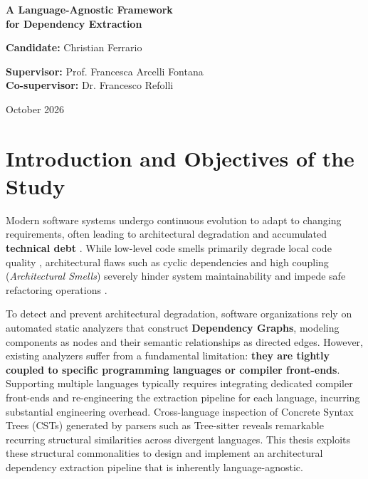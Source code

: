 \documentclass[a4paper, 11pt]{article}
\begin{document}
\begin{center}
  {\LARGE \textbf{A Language-Agnostic Framework\\ for Dependency
  Extraction}\par}

  \vspace{1.6em}
  {\large \textbf{Candidate:} Christian Ferrario\par}

  \vspace{1.0em}
  {\large
    \textbf{Supervisor:} Prof. Francesca Arcelli Fontana\\[0.3em]
  \textbf{Co-supervisor:} Dr. Francesco Refolli\par}

  \vspace{1.6em}
  {\large October 2026\par}
\end{center}

\section{Introduction and Objectives of the Study}
\label{sec:objectives}

Modern software systems undergo continuous evolution to adapt to
changing requirements, often leading to architectural degradation and
accumulated \textbf{technical debt} \cite{lehman_programs_1980,
kruchten_technical_2012}.
While low-level code smells primarily degrade local code quality
\cite{fowler_refactoring_2013}, architectural flaws such as cyclic
dependencies and high coupling (\textit{Architectural Smells})
severely hinder system maintainability and impede safe refactoring operations
\cite{garcia_identifying_2009, arcelli_fontana_independent_2019}.

To detect and prevent architectural degradation, software organizations
rely on automated static analyzers that construct \textbf{Dependency
Graphs}, modeling components as nodes and their semantic relationships
as directed edges.
However, existing analyzers suffer from a fundamental limitation:
\textbf{they are tightly coupled to specific programming languages or
compiler front-ends}.
Supporting multiple languages typically requires integrating
dedicated compiler front-ends and re-engineering the extraction
pipeline for each language, incurring substantial engineering overhead.
Cross-language inspection of Concrete Syntax Trees (CSTs) generated by
parsers such as Tree-sitter \cite{brunsfeld_treesitter_2018} reveals
remarkable recurring structural similarities across divergent languages.
This thesis exploits these structural commonalities to design and
implement an architectural dependency extraction pipeline that is
inherently language-agnostic.
\end{document}
